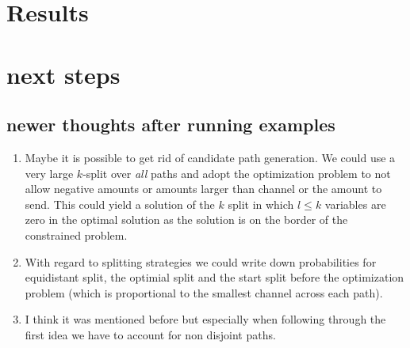 \documentclass[10pt,twocolumn]{article}
\begin{document}





\section{Results}

\section{next steps}

\subsection{newer thoughts after running examples}

\begin{enumerate}
\item Maybe it is possible to get rid of candidate path generation.
We could use a very large $k$-split over \textit{all} paths and adopt the optimization problem to not allow negative amounts or amounts larger than channel or the amount to send.
This could yield a solution of the $k$ split in which $l\leq k$ variables are zero in the optimal solution as the solution is on the border of the constrained problem.
\item With regard to splitting strategies we could write down probabilities for equidistant split, the optimial split and the start split before the optimization problem (which is proportional to the smallest channel across each path).
\item I think it was mentioned before but especially when following through the first idea we have to account for non disjoint paths.
\end{enumerate}
\end{document}
